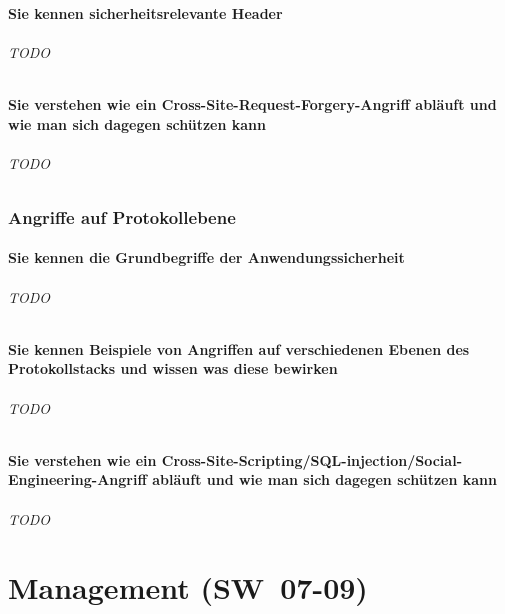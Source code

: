 \documentclass[10pt,a4paper]{article}
\begin{document}
\subsection*{Sie kennen sicherheitsrelevante Header}
\paragraph*{TODO}
\subsection*{Sie verstehen wie ein Cross-Site-Request-Forgery-Angriff abläuft und wie man sich dagegen schützen kann}
\paragraph*{TODO}


\section{Angriffe auf Protokollebene}
\subsection*{Sie kennen die Grundbegriffe der Anwendungssicherheit}
\paragraph*{TODO}
\subsection*{Sie kennen Beispiele von Angriffen auf verschiedenen Ebenen des Protokollstacks und wissen was diese bewirken}
\paragraph*{TODO}
\subsection*{Sie verstehen wie ein Cross-Site-Scripting/SQL-injection/Social-Engineering-Angriff abläuft und wie man sich dagegen schützen kann}
\paragraph*{TODO}



\part{Management (SW~07-09)}
\end{document}
